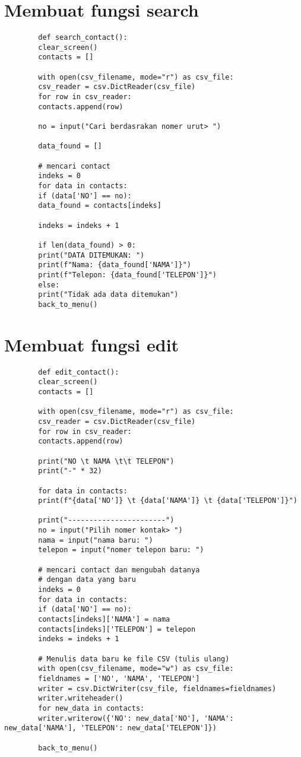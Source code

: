 \documentclass{article}
\begin{document}
	\section{Membuat fungsi search}
	\begin{lstlisting}
		def search_contact():
		clear_screen()
		contacts = []
		
		with open(csv_filename, mode="r") as csv_file:
		csv_reader = csv.DictReader(csv_file)
		for row in csv_reader:
		contacts.append(row)
		
		no = input("Cari berdasrakan nomer urut> ")
		
		data_found = []
		
		# mencari contact
		indeks = 0
		for data in contacts:
		if (data['NO'] == no):
		data_found = contacts[indeks]
		
		indeks = indeks + 1
		
		if len(data_found) > 0:
		print("DATA DITEMUKAN: ")
		print(f"Nama: {data_found['NAMA']}")
		print(f"Telepon: {data_found['TELEPON']}")
		else:
		print("Tidak ada data ditemukan")
		back_to_menu()
	\end{lstlisting}
	
	\section{Membuat fungsi edit}
	\begin{lstlisting}
		def edit_contact():
		clear_screen()
		contacts = []
		
		with open(csv_filename, mode="r") as csv_file:
		csv_reader = csv.DictReader(csv_file)
		for row in csv_reader:
		contacts.append(row)
		
		print("NO \t NAMA \t\t TELEPON")
		print("-" * 32)
		
		for data in contacts:
		print(f"{data['NO']} \t {data['NAMA']} \t {data['TELEPON']}")
		
		print("-----------------------")
		no = input("Pilih nomer kontak> ")
		nama = input("nama baru: ")
		telepon = input("nomer telepon baru: ")
		
		# mencari contact dan mengubah datanya
		# dengan data yang baru
		indeks = 0
		for data in contacts:
		if (data['NO'] == no):
		contacts[indeks]['NAMA'] = nama
		contacts[indeks]['TELEPON'] = telepon
		indeks = indeks + 1
		
		# Menulis data baru ke file CSV (tulis ulang)
		with open(csv_filename, mode="w") as csv_file:
		fieldnames = ['NO', 'NAMA', 'TELEPON']
		writer = csv.DictWriter(csv_file, fieldnames=fieldnames)
		writer.writeheader()
		for new_data in contacts:
		writer.writerow({'NO': new_data['NO'], 'NAMA': new_data['NAMA'], 'TELEPON': new_data['TELEPON']}) 
		
		back_to_menu()
	\end{lstlisting}
	
\end{document}
